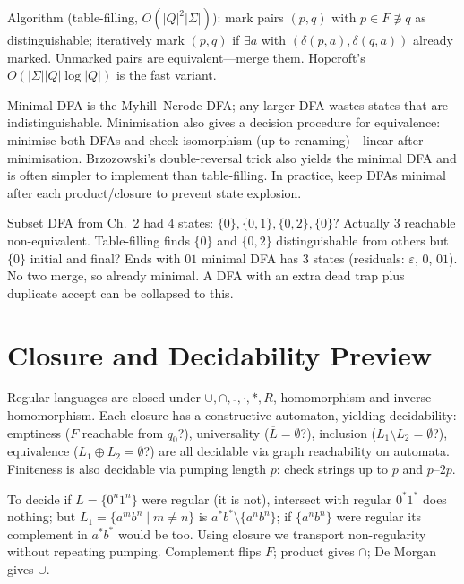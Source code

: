 Algorithm (table-filling, $O(|Q|^2|\Sigma|)$): mark pairs $(p,q)$ with $p\in F\not\ni q$ as distinguishable; iteratively mark $(p,q)$ if $\exists a$ with $(\delta(p,a),\delta(q,a))$ already marked. Unmarked pairs are equivalent---merge them. Hopcroft's $O(|\Sigma||Q|\log|Q|)$ is the fast variant.
\begin{remark}
Minimal DFA is the Myhill--Nerode DFA; any larger DFA wastes states that are indistinguishable. Minimisation also gives a decision procedure for equivalence: minimise both DFAs and check isomorphism (up to renaming)---linear after minimisation.
Brzozowski's double-reversal trick also yields the minimal DFA and is often simpler to implement than table-filling.
In practice, keep DFAs minimal after each product/closure to prevent state explosion.
\end{remark}

\begin{example}
Subset DFA from Ch.~2 had $4$ states: $\{0\},\{0,1\},\{0,2\},\{0\}$? Actually $3$ reachable non-equivalent. Table-filling finds $\{0\}$ and $\{0,2\}$ distinguishable from others but $\{0\}$ initial and final? Ends with $01$ minimal DFA has $3$ states (residuals: $\varepsilon$, $0$, $01$). No two merge, so already minimal. A DFA with an extra dead trap plus duplicate accept can be collapsed to this.
\end{example}

\section{Closure and Decidability Preview}
\label{sec:closure-decidable}
Regular languages are closed under $\cup,\cap,\overline{\ },\cdot,*,R$, homomorphism and inverse homomorphism. Each closure has a constructive automaton, yielding decidability: emptiness ($F$ reachable from $q_0$?), universality ($\overline{L}=\emptyset$?), inclusion ($L_1\setminus L_2=\emptyset$?), equivalence ($L_1\oplus L_2=\emptyset$?) are all decidable via graph reachability on automata. Finiteness is also decidable via pumping length $p$: check strings up to $p$ and $p$--$2p$.

\begin{example}
To decide if $L=\{0^n1^n\}$ were regular (it is not), intersect with regular $0^*1^*$ does nothing; but $L_1=\{a^mb^n\mid m\neq n\}$ is $a^*b^*\setminus\{a^nb^n\}$; if $\{a^nb^n\}$ were regular its complement in $a^*b^*$ would be too. Using closure we transport non-regularity without repeating pumping. Complement flips $F$; product gives $\cap$; De Morgan gives $\cup$.
\end{example}

